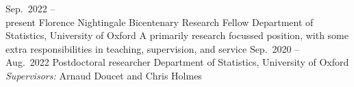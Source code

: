 \documentclass[9pt]{developercv} %
\begin{document}






\vspace{-1em}
\begin{entrylist}
    \entry
    {Sep.\ 2022 --\\ present}
    {Florence Nightingale Bicentenary Research Fellow}
    {Department of Statistics, University of Oxford}
    {A primarily research focussed position, with some extra responsibilities in teaching, supervision, and service}
    \entry
    {Sep.\ 2020 --\\ Aug.\ 2022}
    {Postdoctoral researcher}
    {Department of Statistics, University of Oxford}
    {
    \textit{Supervisors:} Arnaud Doucet and Chris Holmes}
\end{entrylist}
\end{document}
